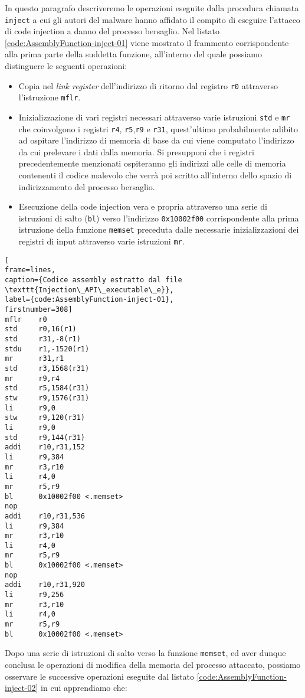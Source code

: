 \documentclass[10pt,a4paper, titlepage]{report}
\begin{document}
In questo paragrafo descriveremo le operazioni eseguite dalla procedura chiamata \texttt{inject} a cui gli autori del malware hanno affidato il compito di eseguire l'attacco di code injection a danno del processo bersaglio.
Nel listato \ref{code:AssemblyFunction-inject-01} viene mostrato il frammento corrispondente alla prima parte della suddetta funzione, all'interno del quale possiamo distinguere le seguenti operazioni:
\begin{itemize}
\item Copia nel \textit{link register} dell'indirizzo di ritorno dal registro \texttt{r0} attraverso l'istruzione \texttt{mflr}.
\item Inizializzazione di vari registri necessari attraverso varie istruzioni \texttt{std} e \texttt{mr} che coinvolgono i registri \texttt{r4}, \texttt{r5},\texttt{r9} e  \texttt{r31}, quest'ultimo probabilmente adibito ad ospitare l'indirizzo di memoria di base da cui viene computato l'indirizzo da cui prelevare i dati dalla memoria. Si presupponi che i registri precedentemente menzionati ospiteranno gli indirizzi alle celle di memoria contenenti il codice malevolo che verrà poi scritto all'interno dello spazio di indirizzamento del processo bersaglio.
\item Esecuzione della code injection vera e propria attraverso una serie di istruzioni di salto (\texttt{bl}) verso l'indirizzo \texttt{0x10002f00} corrispondente alla prima istruzione della funzione \texttt{memset} preceduta dalle necessarie inizializzazioni dei registri di input attraverso varie istruzioni \texttt{mr}.
\end{itemize}

\begin{lstlisting}[
frame=lines, 
caption={Codice assembly estratto dal file \texttt{Injection\_API\_executable\_e}}, 
label={code:AssemblyFunction-inject-01},
firstnumber=308]
mflr    r0
std     r0,16(r1)
std     r31,-8(r1)
stdu    r1,-1520(r1)
mr      r31,r1
std     r3,1568(r31)
mr      r9,r4
std     r5,1584(r31)
stw     r9,1576(r31)
li      r9,0
stw     r9,120(r31)
li      r9,0
std     r9,144(r31)
addi    r10,r31,152
li      r9,384
mr      r3,r10
li      r4,0
mr      r5,r9
bl      0x10002f00 <.memset>
nop
addi    r10,r31,536
li      r9,384
mr      r3,r10
li      r4,0
mr      r5,r9
bl      0x10002f00 <.memset>
nop
addi    r10,r31,920
li      r9,256
mr      r3,r10
li      r4,0
mr      r5,r9
bl      0x10002f00 <.memset>
\end{lstlisting}

Dopo una serie di istruzioni di salto verso la funzione \texttt{memset}, ed aver dunque conclusa le operazioni di modifica della memoria del processo attaccato, possiamo osservare le successive operazioni eseguite dal listato \ref{code:AssemblyFunction-inject-02} in cui apprendiamo che:
\end{document}
